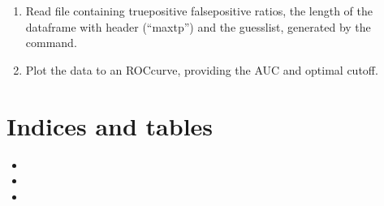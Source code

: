 \documentclass[letterpaper,10pt,english]{sphinxmanual}
\begin{document}
{{{{\begin{fulllineitems}
\end{fulllineitems}


\begin{fulllineitems}
\label{\detokenize{mkloanpy:ronataswestoldturkiccommands.plot_eval.run}}
\pysigstartsignatures
{}
\pysigstopsignatures\begin{enumerate}
%
\item {} 
\sphinxAtStartPar
Read file  containing true\sphinxhyphen{}positive
false\sphinxhyphen{}positive ratios, the length of the dataframe with header
(“maxtp”) and the guesslist, generated by the  command.

\item {} 
\sphinxAtStartPar
Plot the data to an ROC\sphinxhyphen{}curve, providing the AUC and optimal cut\sphinxhyphen{}off.

\end{enumerate}

\end{fulllineitems}



\chapter{Indices and tables}
\label{\detokenize{index:indices-and-tables}}\begin{itemize}
\item {} 
\sphinxAtStartPar
{}

\item {} 
\sphinxAtStartPar
{}

\item {} 
\sphinxAtStartPar
{}

\end{itemize}


}}}}
\end{document}
